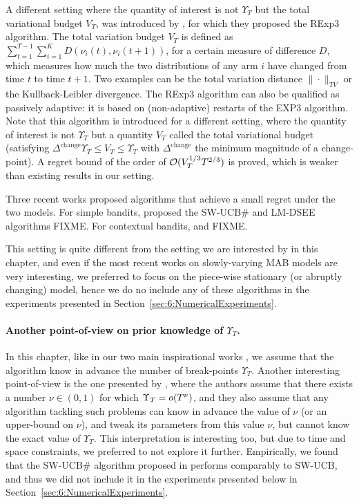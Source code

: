 A different setting where the quantity of interest is not $\Upsilon_T$ but the total variational budget $V_T$, was introduced by \cite{Besbes14stochastic}, for which they proposed the RExp3 algorithm.
The total variation budget $V_T$ is defined as $\sum_{t=1}^{T-1} \sum_{i=1}^K D(\nu_i(t), \nu_i(t+1))$, for a certain measure of difference $D$, which measures how much the two distributions of any arm $i$ have changed from time $t$ to time $t+1$.
Two examples can be the total variation distance $\|\cdot\|_{TV}$ or the Kullback-Leibler divergence.
%
The RExp3 algorithm can also be qualified as passively adaptive: it is based on (non-adaptive) restarts of the EXP3 algorithm. Note that this algorithm is introduced for a different setting, where the quantity of interest is not $\Upsilon_T$ but a quantity $V_T$ called the total variational budget (satisfying $\Delta^{\text{change}} \Upsilon_T \leq V_T \leq \Upsilon_T$ with $\Delta^{\text{change}}$ the minimum magnitude of a change-point).
A regret bound of the order of $\mathcal{O}(V_T^{1/3} T^{2/3})$ is proved, which is weaker than existing results in our setting.

Three recent works proposed algorithms that achieve a small regret under the two models.
For simple bandits, \cite{WeiSrivastava18Abruptly} proposed the SW-UCB\# and LM-DSEE algorithms FIXME.
For contextual bandits, \cite{Luo18} and \cite{ChenLeeLuoWei2019} FIXME.

This setting is quite different from the setting we are interested by in this chapter, and even if the most recent works on slowly-varying MAB models are very interesting, we preferred to focus on the piece-wise stationary (or abruptly changing) model,
hence we do no include any of these algorithms in the experiments presented in Section~\ref{sec:6:NumericalExperiments}.


\paragraph{Another point-of-view on prior knowledge of $\Upsilon_T$.}
%
In this chapter, like in our two main inspirational works \cite{CaoZhenKvetonXie18,LiuLeeShroff17},
we assume that the algorithm know in advance the number of break-points $\Upsilon_T$.
Another interesting point-of-view is the one presented by \cite{WeiSrivastava18Abruptly,WeiSrivastava18Distributed},
where the authors assume that there exists a number $\nu\in(0,1)$ for which $\Upsilon_T = \mathop{}\mathopen{}o\mathopen{}\left(T^{\nu}\right)$,
and they also assume that any algorithm tackling such problems can know in advance the value of $\nu$ (or an upper-bound on $\nu$), and tweak its parameters from this value $\nu$, but cannot know the exact value of $\Upsilon_T$.
%
This interpretation is interesting too, but due to time and space constraints, we preferred to not explore it further.
Empirically, we found that the SW-UCB\# algorithm proposed in \cite{WeiSrivastava18Abruptly} performs comparably to SW-UCB, and thus we did not include it in the experiments presented below in Section~\ref{sec:6:NumericalExperiments}.

